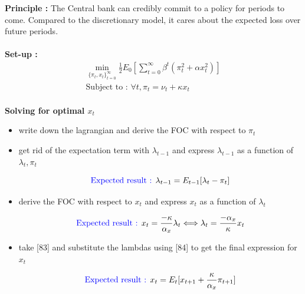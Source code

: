 \documentclass{article}
\begin{document}
\textbf{Principle : } The Central bank can credibly commit to a policy for periods to come. Compared to the discretionary model, it cares about the expected loss over future periods. \\
\\ \textbf{Set-up : }
\begin{equation}
\begin{aligned}
        \min_{\{\pi_t,x_t\}_{t=0}^\infty} \frac{1}{2}E_0[\sum_{t=0}^\infty\beta^t(\pi_t^2+\alpha x_t^2)]\\
        \text{Subject to : } \forall t, \pi_t =\nu_t + \kappa x_t 
\end{aligned}
\end{equation}\\
\textbf{Solving for optimal $x_t$}
\begin{itemize}
    \item write down the lagrangian and derive the FOC with respect to $\pi_t$ 
    \item get rid of the expectation term with $\lambda_{t-1}$ and express $\lambda_{t-1}$ as a function of $\lambda_t, \pi_t$
    \begin{expectedresultsbox}
    \begin{equation}
        \text{\textcolor{blue}{Expected result : }} \lambda_{t-1} = E_{t-1}[\lambda_t-\pi_t] 
    \end{equation}
    \end{expectedresultsbox}
    \item derive the FOC with respect to $x_t$ and express $x_t$ as a function of $\lambda_t$
    \begin{expectedresultsbox}
    \begin{equation}
        \text{\textcolor{blue}{Expected result : }} x_t = \frac{-\kappa}{\alpha_x}\lambda_t \Longleftrightarrow \lambda_t = \frac{-\alpha_x}{\kappa}x_t
    \end{equation}
    \end{expectedresultsbox}
    \item take [83] and substitute the lambdas using [84] to get the final expression for $x_t$
        \begin{expectedresultsbox}
    \begin{equation}
        \text{\textcolor{blue}{Expected result : }} x_t = E_t[x_{t+1}+\frac{\kappa}{\alpha_x}\pi_{t+1}]
    \end{equation}
    \end{expectedresultsbox}

\end{itemize}
\end{document}
